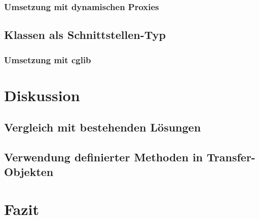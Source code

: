 \documentclass[11pt, 
ngerman,
doublespacing,
chapterinoneline, %
consistentlayout, %
]{scrartcl}
\begin{document}
\subsubsection{Umsetzung mit dynamischen Proxies}

\cite{proxy}
\subsection{Klassen als Schnittstellen-Typ}\label{sec_classes}
\subsubsection{Umsetzung mit cglib}
\cite{cglib}
\section{Diskussion}
\subsection{Vergleich mit bestehenden Lösungen}
\subsection{Verwendung definierter Methoden in Transfer-Objekten}
\section{Fazit}

{}

\nocite{*}
\end{document}
